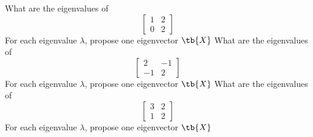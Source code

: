 

\bexo
What are the eigenvalues of 
\begin{equation*}
\left[
\begin{array}{cc}
1 & 2 \\
0 & 2
\end{array}
\right]
\end{equation*}
For each eigenvalue $\lambda$, propose one eigenvector $\tb{X}$
\eexo{}
\bexo
What are the eigenvalues of 
\begin{equation*}
\left[
\begin{array}{cc}
2 & -1 \\
-1 & 2
\end{array}
\right]
\end{equation*}
For each eigenvalue $\lambda$, propose one eigenvector $\tb{X}$
\eexo{}
\bexo
What are the eigenvalues of 
\begin{equation*}
\left[
\begin{array}{cc}
3 & 2 \\
1 & 2
\end{array}
\right]
\end{equation*}
For each eigenvalue $\lambda$, propose one eigenvector $\tb{X}$
\eexo{}

